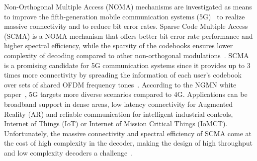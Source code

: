 Non-Orthogonal Multiple Access (NOMA) mechanisms are investigated as means to
improve the fifth-generation mobile communication systems (5G)~\cite{Islam2017}
to realize massive connectivity and to reduce bit error rates. Sparse Code
Multiple Access (SCMA) is a NOMA mechanism that offers better bit error rate
performance and higher spectral efficiency, while the sparsity of the codebooks
ensures lower complexity of decoding compared to other non-orthogonal
modulations~\cite{Nikopour2013}. SCMA is a promising candidate for 5G
communication systems since it provides up to 3 times more connectivity by
spreading the information of each user's codebook over sets of shared OFDM
frequency tones~\cite{Altera2015}. According to the NGMN white
paper~\cite{Alliance2015}, 5G targets more diverse scenarios compared to 4G.
Applications can be broadband support in dense areas, low latency connectivity
for Augmented Reality (AR) and reliable communication for intelligent industrial
controls, Internet of Things (IoT) or Internet of Mission Critical Things
(IoMCT). Unfortunately, the massive connectivity and spectral efficiency of SCMA
come at the cost of high complexity in the decoder, making the design of high
throughput and low complexity decoders a challenge~\cite{Lu2015}.

